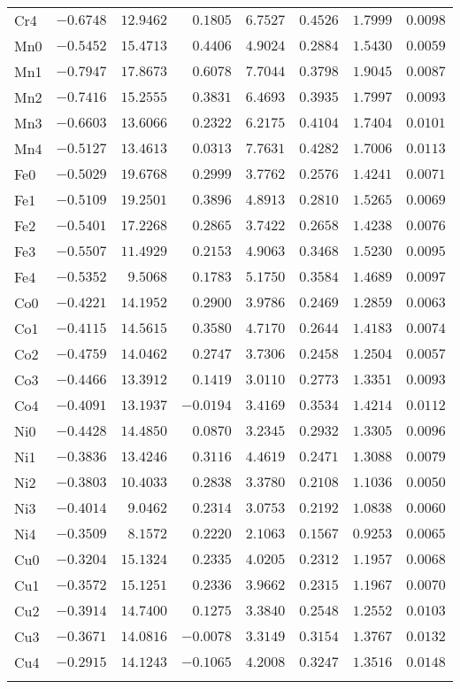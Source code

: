 \begin{table}[H]
{\begin{tabular}{lrrrrrrr}
Cr4 &$-0.6748$ &$12.9462$ &$0.1805$ &$6.7527$ &$0.4526$ &$1.7999$ &$0.0098$ \\
Mn0 &$-0.5452$ &$15.4713$ &$0.4406$ &$4.9024$ &$0.2884$ &$1.5430$ &$0.0059$ \\
Mn1 &$-0.7947$ &$17.8673$ &$0.6078$ &$7.7044$ &$0.3798$ &$1.9045$ &$0.0087$ \\
Mn2 &$-0.7416$ &$15.2555$ &$0.3831$ &$6.4693$ &$0.3935$ &$1.7997$ &$0.0093$ \\
Mn3 &$-0.6603$ &$13.6066$ &$0.2322$ &$6.2175$ &$0.4104$ &$1.7404$ &$0.0101$ \\
Mn4 &$-0.5127$ &$13.4613$ &$0.0313$ &$7.7631$ &$0.4282$ &$1.7006$ &$0.0113$ \\
Fe0 &$-0.5029$ &$19.6768$ &$0.2999$ &$3.7762$ &$0.2576$ &$1.4241$ &$0.0071$ \\
Fe1 &$-0.5109$ &$19.2501$ &$0.3896$ &$4.8913$ &$0.2810$ &$1.5265$ &$0.0069$ \\
Fe2 &$-0.5401$ &$17.2268$ &$0.2865$ &$3.7422$ &$0.2658$ &$1.4238$ &$0.0076$ \\
Fe3 &$-0.5507$ &$11.4929$ &$0.2153$ &$4.9063$ &$0.3468$ &$1.5230$ &$0.0095$ \\
Fe4 &$-0.5352$ &$9.5068$ &$0.1783$ &$5.1750$ &$0.3584$ &$1.4689$ &$0.0097$ \\
Co0 &$-0.4221$ &$14.1952$ &$0.2900$ &$3.9786$ &$0.2469$ &$1.2859$ &$0.0063$ \\
Co1 &$-0.4115$ &$14.5615$ &$0.3580$ &$4.7170$ &$0.2644$ &$1.4183$ &$0.0074$ \\
Co2 &$-0.4759$ &$14.0462$ &$0.2747$ &$3.7306$ &$0.2458$ &$1.2504$ &$0.0057$ \\
Co3 &$-0.4466$ &$13.3912$ &$0.1419$ &$3.0110$ &$0.2773$ &$1.3351$ &$0.0093$ \\
Co4 &$-0.4091$ &$13.1937$ &$-0.0194$ &$3.4169$ &$0.3534$ &$1.4214$ &$0.0112$ \\
Ni0 &$-0.4428$ &$14.4850$ &$0.0870$ &$3.2345$ &$0.2932$ &$1.3305$ &$0.0096$ \\
Ni1 &$-0.3836$ &$13.4246$ &$0.3116$ &$4.4619$ &$0.2471$ &$1.3088$ &$0.0079$ \\
Ni2 &$-0.3803$ &$10.4033$ &$0.2838$ &$3.3780$ &$0.2108$ &$1.1036$ &$0.0050$ \\
Ni3 &$-0.4014$ &$ 9.0462$ &$0.2314$ &$3.0753$ &$0.2192$ &$1.0838$ &$0.0060$ \\
Ni4 &$-0.3509$ &$8.1572$ &$0.2220$ &$2.1063$ &$0.1567$ &$0.9253$ &$0.0065$ \\
Cu0 &$-0.3204$ &$15.1324$ &$0.2335$ &$4.0205$ &$0.2312$ &$1.1957$ &$0.0068$ \\
Cu1 &$-0.3572$ &$15.1251$ &$0.2336$ &$3.9662$ &$0.2315$ &$1.1967$ &$0.0070$ \\
Cu2 &$-0.3914$ &$14.7400$ &$0.1275$ &$3.3840$ &$0.2548$ &$1.2552$ &$0.0103$ \\
Cu3 &$-0.3671$ &$14.0816$ &$-0.0078$ &$3.3149$ &$0.3154$ &$1.3767$ &$0.0132$ \\
Cu4 &$-0.2915$ &$14.1243$ &$-0.1065$ &$4.2008$ &$0.3247$ &$1.3516$ &$0.0148$ \\
\hline\\[-2ex]
\end{tabular}
}
\end{table}
